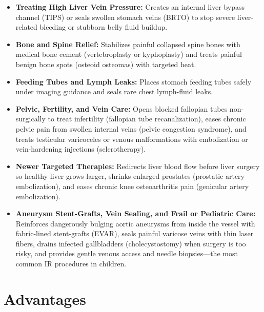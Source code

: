 \begin{itemize}
    \item \textbf{Treating High Liver Vein Pressure:} Creates an internal liver bypass channel (TIPS) or seals swollen stomach veins (BRTO) to stop severe liver-related bleeding or stubborn belly fluid buildup.
    \item \textbf{Bone and Spine Relief:} Stabilizes painful collapsed spine bones with medical bone cement (vertebroplasty or kyphoplasty) and treats painful benign bone spots (osteoid osteomas) with targeted heat.
    \item \textbf{Feeding Tubes and Lymph Leaks:} Places stomach feeding tubes safely under imaging guidance and seals rare chest lymph-fluid leaks.
    \item \textbf{Pelvic, Fertility, and Vein Care:} Opens blocked fallopian tubes non-surgically to treat infertility (fallopian tube recanalization), eases chronic pelvic pain from swollen internal veins (pelvic congestion syndrome), and treats testicular varicoceles or venous malformations with embolization or vein-hardening injections (sclerotherapy).
    \item \textbf{Newer Targeted Therapies:} Redirects liver blood flow before liver surgery so healthy liver grows larger, shrinks enlarged prostates (prostatic artery embolization), and eases chronic knee osteoarthritis pain (genicular artery embolization).
    \item \textbf{Aneurysm Stent-Grafts, Vein Sealing, and Frail or Pediatric Care:} Reinforces dangerously bulging aortic aneurysms from inside the vessel with fabric-lined stent-grafts (EVAR), seals painful varicose veins with thin laser fibers, drains infected gallbladders (cholecystostomy) when surgery is too risky, and provides gentle venous access and needle biopsies---the most common IR procedures in children.
\end{itemize}

\section{Advantages}


